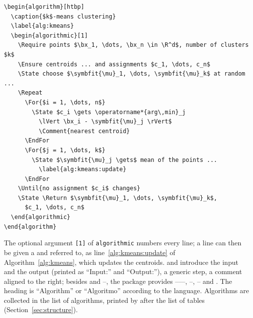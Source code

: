 \begin{Verbatim}
\begin{algorithm}[htbp]
  \caption{$k$-means clustering}
  \label{alg:kmeans}
  \begin{algorithmic}[1]
    \Require points $\bx_1, \dots, \bx_n \in \R^d$, number of clusters $k$
    \Ensure centroids ... and assignments $c_1, \dots, c_n$
    \State choose $\symbfit{\mu}_1, \dots, \symbfit{\mu}_k$ at random ...
    \Repeat
      \For{$i = 1, \dots, n$}
        \State $c_i \gets \operatorname*{arg\,min}_j
          \lVert \bx_i - \symbfit{\mu}_j \rVert$
          \Comment{nearest centroid}
      \EndFor
      \For{$j = 1, \dots, k$}
        \State $\symbfit{\mu}_j \gets$ mean of the points ...
          \label{alg:kmeans:update}
      \EndFor
    \Until{no assignment $c_i$ changes}
    \State \Return $\symbfit{\mu}_1, \dots, \symbfit{\mu}_k$,
      $c_1, \dots, c_n$
  \end{algorithmic}
\end{algorithm}
\end{Verbatim}
The optional argument \texttt{[1]} of \texttt{algorithmic} numbers every
line; a line can then be given a  and referred to, as
line~\ref{alg:kmeans:update} of Algorithm~\ref{alg:kmeans}, which updates
the centroids.  and  introduce the input and the
output (printed as ``Input:'' and ``Output:''),  a generic
step,  a comment aligned to the right; besides  and --, the package provides
------, --,
-- and . The heading is
``Algorithm'' or ``Algoritmo'' according to the language. Algorithms are
collected in
the list of algorithms, printed by  after the list of
tables (Section~\ref{sec:structure}).
